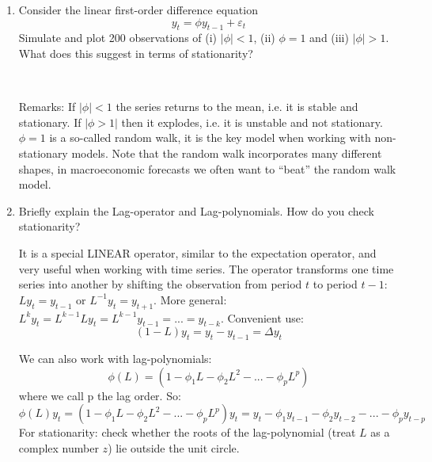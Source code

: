 \documentclass[a4paper]{scrartcl}
\begin{document}
\begin{enumerate}
	\item Consider the linear first-order difference equation $$y_t=\phi y_{t-1}+\varepsilon_t$$ Simulate and plot 200 observations of (i) $|\phi|<1$, (ii) $\phi=1$ and (iii) $|\phi| >1$. What does this suggest in terms of stationarity?
	\begin{solution}~		
		
	Remarks: If $|\phi|<1$ the series returns to the mean, i.e. it is stable and stationary. If $|\phi>1|$ then it explodes, i.e. it is unstable and not stationary. $\phi=1$ is a so-called random walk, it is the key model when working with non-stationary models. Note that the random walk incorporates many different shapes, in macroeconomic forecasts we often want to \enquote{beat} the random walk model.
	\end{solution}
	\item Briefly explain the Lag-operator and Lag-polynomials. How do you check stationarity?
	\begin{solution}
		It is a special LINEAR operator, similar to the expectation operator, and very useful when working with time series. The operator transforms one time series into another by shifting the observation from period $t$ to period $t-1$: $Ly_t = y_{t-1}$ or $L^{-1} y_t =y_{t+1}$. More general: $L^k y_t = L^{k-1} L y_t = L^{k-1} y_{t-1} = ... = y_{t-k}$. Convenient use:
		$$(1-L)y_t = y_t - y_{t-1}= \Delta y_t$$
		
		We can also work with lag-polynomials:$$ \phi(L) = (1-\phi_1 L-\phi_2 L^2 -... - \phi_p L^p)$$ where we call p the lag order. So:
		$$ \phi(L) y_t = (1-\phi_1 L-\phi_2 L^2 -... - \phi_p L^p)y_t = y_t - \phi_1 y_{t-1} -\phi_2 y_{t-2} - ... - \phi_p y_{t-p}$$
		For stationarity: check whether the roots of the lag-polynomial (treat $L$ as a complex number $z$) lie outside the unit circle.
		\newpage
	\end{solution}
\end{enumerate}
\newpage
\end{document}
